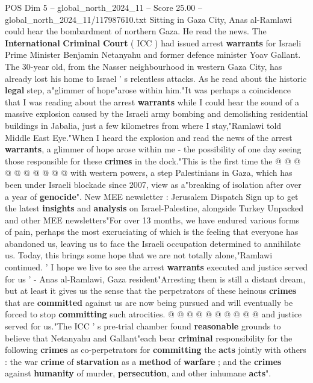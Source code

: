 \begin{textsample}{POS Dim 5 – global\_north\_2024\_11 – Score 25.00 – global\_north\_2024\_11/117987610.txt}  \label{ex:f5_pos_031}
Sitting in Gaza City, Anas al-Ramlawi could hear the bombardment of northern Gaza.
He read the news.
The \textbf{International} \textbf{Criminal} \textbf{Court} ( ICC ) had issued arrest \textbf{warrants} for Israeli Prime Minister Benjamin Netanyahu and former defence minister Yoav Gallant.
The 30-year old, from the Nasser neighbourhood in western Gaza City, has already lost his home to Israel ' s relentless attacks.
As he read about the historic \textbf{legal} step, a"glimmer of hope"arose within him."It was perhaps a coincidence that I was reading about the arrest \textbf{warrants} while I could hear the sound of a massive explosion caused by the Israeli army bombing and demolishing residential buildings in Jabalia, just a few kilometres from where I stay,"Ramlawi told Middle East Eye."When I heard the explosion and read the news of the arrest \textbf{warrants}, a glimmer of hope arose within me - the possibility of one day seeing those responsible for these \textbf{crimes} in the dock."This is the first time the @ @ @ @ @ @ @ @ @ @ with western powers, a step Palestinians in Gaza, which has been under Israeli blockade since 2007, view as a"breaking of isolation after over a year of \textbf{genocide}".
New MEE newsletter : Jerusalem Dispatch Sign up to get the latest \textbf{insights} and \textbf{analysis} on Israel-Palestine, alongside Turkey Unpacked and other MEE newsletters"For over 13 months, we have endured various forms of pain, perhaps the most excruciating of which is the feeling that everyone has abandoned us, leaving us to face the Israeli occupation determined to annihilate us.
Today, this brings some hope that we are not totally alone,"Ramlawi continued. ' I hope we live to see the arrest \textbf{warrants} executed and justice served for us ' - Anas al-Ramlawi, Gaza resident"Arresting them is still a distant dream, but at least it gives us the sense that the perpetrators of these heinous \textbf{crimes} that are \textbf{committed} against us are now being pursued and will eventually be forced to stop \textbf{committing} such atrocities. @ @ @ @ @ @ @ @ @ @ and justice served for us."The ICC ' s pre-trial chamber found \textbf{reasonable} grounds to believe that Netanyahu and Gallant"each bear \textbf{criminal} responsibility for the following \textbf{crimes} as co-perpetrators for \textbf{committing} the \textbf{acts} jointly with others : the war \textbf{crime} of \textbf{starvation} as a \textbf{method} of \textbf{warfare} ; and the \textbf{crimes} against \textbf{humanity} of murder, \textbf{persecution}, and other inhumane \textbf{acts}".

\end{textsample}
